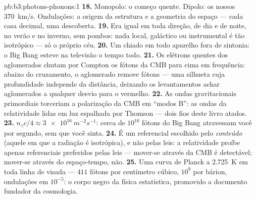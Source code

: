 \begin{solution}{pb:b3:photons-phonons:1}
\textbf{18.} Monopolo: o começo quente. Dipolo: os nossos
\qty{370}{km/s}. Ondulações: a origem da estrutura e a
geometria do espaço --- cada casa decimal, uma descoberta.
\textbf{19.} Era igual em toda direção, de dia e de noite,
no verão e no inverno, sem pombos: nada local, galáctico ou
instrumental é tão isotrópico --- só o próprio céu.
\textbf{20.} Um chiado em todo aparelho fora de sintonia: o Big Bang
esteve na televisão o tempo todo.
\textbf{21.} Os elétrons quentes dos aglomerados chutam por Compton os
fótons da CMB para cima em frequência: abaixo do cruzamento, o
aglomerado remove fótons --- uma silhueta cuja profundidade independe da
distância, deixando os levantamentos achar aglomerados a qualquer desvio
para o vermelho.
\textbf{22.} As ondas gravitacionais primordiais torceriam a
polarização da CMB em ``modos B'': as ondas da relatividade lidas em
luz espalhada por Thomson --- dois fios deste livro atados.
\textbf{23.} $n_\gamma c/4 \approx \qty{3e16}{m^{-2}s^{-1}}$:
cerca de $10^{16}$ fótons do Big Bang atravessam você por segundo,
sem que você sinta.
\textbf{24.} É um referencial escolhido pelo \emph{conteúdo}
(aquele em que a radiação é isotrópica), e não pelas leis: a
relatividade proíbe apenas referenciais preferidos pelas leis ---
mover-se através da CMB é detectável; mover-se através do
espaço-tempo, não.
\textbf{25.} Uma curva de Planck a \qty{2.725}{K} em toda linha de
visada --- $411$ fótons por centímetro cúbico, $10^9$ por bárion,
ondulações em $10^{-5}$: o corpo negro da física estatística, promovido
a documento fundador da cosmologia.
\end{solution}
